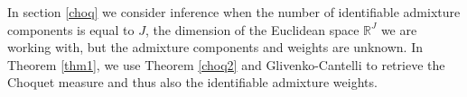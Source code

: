 \documentclass[12pt, reqno]{amsart}
\theoremstyle{definition}
\begin{document}







In section \ref{choq} we consider inference when the number of identifiable admixture components is equal to $J$, the dimension of the Euclidean space $\mathbb{R}^J$ we are working with, but the admixture components and weights are unknown. In Theorem \ref{thm1}, we use Theorem \ref{choq2} and Glivenko-Cantelli to retrieve the Choquet measure and thus also the identifiable admixture weights.


\end{document}
